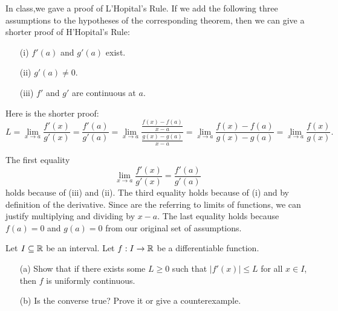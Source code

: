 \documentclass[a4paper]{article}
\begin{document}
\begin{problem}
    In class,we gave a proof of L'Hopital's Rule. If we add the following three assumptions to the hypotheses of the corresponding theorem, then we can give a shorter proof of H'Hopital's Rule:
    \begin{enumerate}
        \item[(i)] \( f'(a) \) and \( g'(a) \) exist. 
        \item[(ii)] \( g'(a) \neq 0 \).
        \item[(iii)] \( f' \) and \( g' \) are continuous at \( a  \).
    \end{enumerate}
    Here is the shorter proof:
    \[  L = \lim_{ x \to a }  \frac{ f'(x) }{ g'(x) }  = \frac{ f'(a) }{ g'(a) } = \lim_{ x \to a }  \frac{ \frac{ f(x) - f(a) }{ x - a  }  }{  \frac{ g(x) - g(a) }{ x - a  }  } = \lim_{ x \to a }  \frac{ f(x) - f(a) }{  g(x) - g(a) }  = \lim_{ x \to a }  \frac{ f(x)  }{  g(x) }.  \]
\end{problem}
\begin{solution}
    The first equality
    \[  \lim_{ x \to a }  \frac{ f'(x) }{ g'(x) }  = \frac{ f'(a) }{  g'(a) } \]
    holds because of (iii) and (ii). The third equality holds because of (i) and by definition of the derivative. Since are the referring to limits of functions, we can justify multiplying and dividing by \( x - a  \). The last equality holds because \( f(a) = 0  \) and \( g(a) = 0  \) from our original set of assumptions.
\end{solution}


\begin{problem}
    Let \( I \subseteq  \mathbb{R}   \) be an interval. Let \( f: I \to \mathbb{R}  \) be a differentiable function. 
    \begin{enumerate}
        \item[(a)] Show that if there exists some \( L \geq 0  \) such that \( | f'(x) | \leq L  \) for all \( x \in I  \), then \( f  \) is uniformly continuous.
        \item[(b)] Is the converse true? Prove it or give a counterexample. 
    \end{enumerate}
\end{problem}
\end{document}

